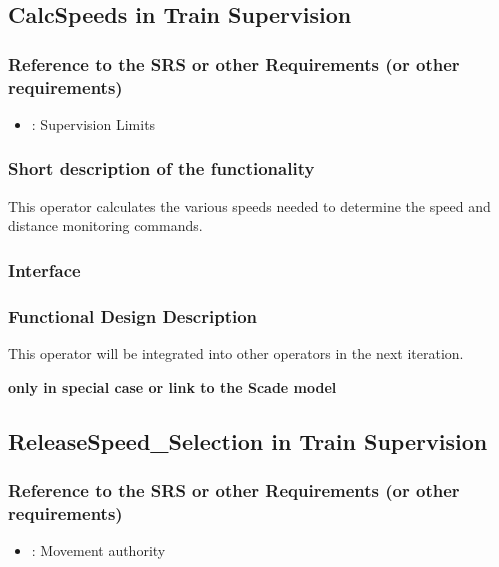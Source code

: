 \subsection{CalcSpeeds in Train Supervision}

\subsubsection{Reference to the SRS or other Requirements (or other requirements)}
\begin{itemize}
	\item \cite[Chapt.~3.13.9]{subset-026}: Supervision Limits 
\end{itemize}

\subsubsection{Short description of the functionality}
This operator calculates the various speeds needed to determine the speed and distance monitoring commands.

\subsubsection{Interface}

\subsubsection{Functional Design Description}
This operator will be integrated into other operators in the next iteration.

\textbf{only in special case or link to the Scade model}

\subsection{ReleaseSpeed\_Selection in Train Supervision}

\subsubsection{Reference to the SRS or other Requirements (or other requirements)}
\begin{itemize}
	\item \cite[Chapt.~3.8]{subset-026}: Movement authority 
\end{itemize}

